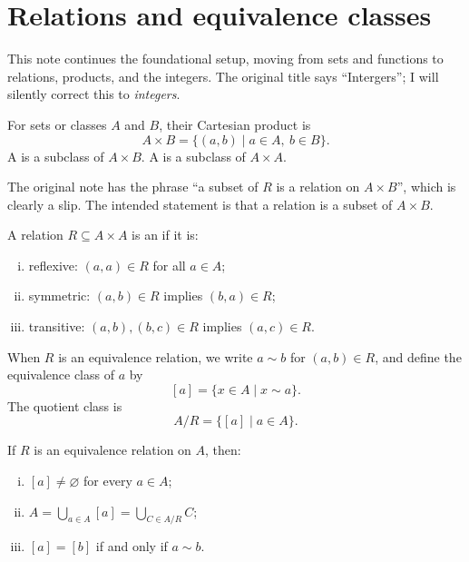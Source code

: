 
\section{Relations and equivalence classes}

This note continues the foundational setup, moving from sets and functions to relations, products, and the integers.  The original title says ``Intergers''; I will silently correct this to \emph{integers}.

\begin{definition}
For sets or classes \(A\) and \(B\), their Cartesian product is
\[
  A\times B=\{(a,b)\mid a\in A,\ b\in B\}.
\]
A  is a subclass of \(A\times B\).  A  is a subclass of \(A\times A\).
\end{definition}

\begin{caution}
The original note has the phrase ``a subset of \(R\) is a relation on \(A\times B\)'', which is clearly a slip.  The intended statement is that a relation is a subset of \(A\times B\).
\end{caution}

\begin{definition}
A relation \(R\subseteq A\times A\) is an  if it is:
\begin{enumerate}[(i)]
  \item reflexive: \((a,a)\in R\) for all \(a\in A\);
  \item symmetric: \((a,b)\in R\) implies \((b,a)\in R\);
  \item transitive: \((a,b),(b,c)\in R\) implies \((a,c)\in R\).
\end{enumerate}
When \(R\) is an equivalence relation, we write \(a\sim b\) for \((a,b)\in R\), and define the equivalence class of \(a\) by
\[
  [a]=\{x\in A\mid x\sim a\}.
\]
The quotient class is
\[
  A/R=\{[a]\mid a\in A\}.
\]
\end{definition}

\begin{proposition}
If \(R\) is an equivalence relation on \(A\), then:
\begin{enumerate}[(i)]
  \item \([a]\neq\varnothing\) for every \(a\in A\);
  \item \(A=\bigcup_{a\in A}[a]=\bigcup_{C\in A/R}C\);
  \item \([a]=[b]\) if and only if \(a\sim b\).
\end{enumerate}
\end{proposition}

